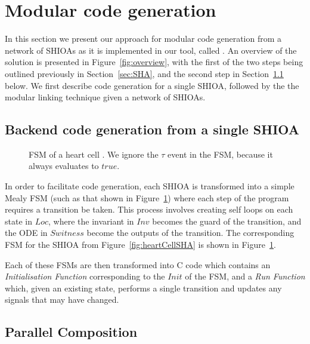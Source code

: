 \section{Modular code generation}
\label{sec:codeGen}

In this section we present our approach for modular code generation from
a network of \acp{SHIOA} as it is implemented in our tool, called
\ourTool. An overview of the solution is presented in
Figure~\ref{fig:overview}, with the first of the two steps being
outlined previously in Section~\ref{sec:SHA}, and the second step in
Section~\ref{sec:backendCodeGeneration} below. We first describe code
generation for a single \ac{SHIOA}, followed by the the modular linking
technique given a network of \acp{SHIOA}.

\subsection{Backend code generation from a single \ac{SHIOA}}
\label{sec:backendCodeGeneration}

\begin{figure}
  \centering
  
  \caption{\acf{FSM} of a heart cell \label{fig:heartCellFSM}. We ignore
    the $\tau$ event in the FSM, because it always evaluates to $true$.}
\end{figure}

In order to facilitate code generation, each \ac{SHIOA} is transformed
into a simple Mealy \ac{FSM} (such as that shown in
Figure~\ref{fig:heartCellFSM}) where each step of the program requires a
transition be taken.  This process involves creating self loops on each
state in $Loc$, where the invariant in $Inv$ becomes the guard of the
transition, and the \acs{ODE} in $Switness$ become the outputs of the
transition.  The corresponding \ac{FSM} for the \ac{SHIOA} from
Figure~\ref{fig:heartCellSHA} is shown in Figure~\ref{fig:heartCellFSM}.

Each of these \acp{FSM} are then transformed into C code which contains
an \emph{Initialisation Function} corresponding to the $Init$ of the
\ac{FSM}, and a \emph{Run Function} which, given an existing state,
performs a single transition and updates any signals that may have
changed.


\subsection{Parallel Composition}
\label{sec:composition}

